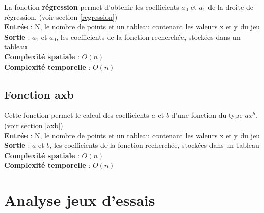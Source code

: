 \documentclass[12pt,french,titlepage]{article}
\begin{document}
	La fonction \textbf{régression} permet d'obtenir les coefficients $a_0$ et $a_1$ de  la droite de régression. (voir section \ref{regression})\\
	
	\textbf{Entrée} : N, le nombre de points et un tableau contenant les valeurs x et y du jeu\\
	\textbf{Sortie} : $a_1$ et $a_0$, les coefficients de la fonction recherchée, stockées dans un tableau\\
	\textbf{Complexité spatiale} : $O(n)$\\
	\textbf{Complexité temporelle} : $O(n) $\\
	
	\subsection{Fonction axb}
	
	\medskip
	Cette fonction permet le calcul des coefficients $a$ et $b$ d'une fonction du type $ax^b$. (voir section \ref{axb})\\
	
	\textbf{Entrée} : N, le nombre de points et un tableau contenant les valeurs x et y du jeu\\
	\textbf{Sortie} : $a$ et $b$, les coefficients de la fonction recherchée, stockées dans un tableau\\
	\textbf{Complexité spatiale} : $O(n)$\\
	\textbf{Complexité temporelle} : $O(n) $\\
	
	\section{Analyse jeux d'essais}
	
\end{document}

